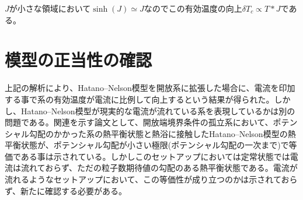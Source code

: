 \documentclass[dvipdfmx,autodetect-engine]{jsarticle}
\begin{document}
$J$が小さな領域において$\sinh(J)\simeq J$なのでこの有効温度の向上$\delta T_c\propto T*J$である。

\section{模型の正当性の確認}
上記の解析により、Hatano--Nelson模型を開放系に拡張した場合に、電流を印加する事で系の有効温度が電流に比例して向上するという結果が得られた。しかし、Hatano--Nelson模型が現実的な電流が流れている系を表現しているかは別の問題である。関連を示す論文として、開放端境界条件の孤立系において、ポテンシャル勾配のかかった系の熱平衡状態と熱浴に接触したHatano--Nelson模型の熱平衡状態が、ポテンシャル勾配が小さい極限(ポテンシャル勾配の一次まで)で等価である事は示されている\cite{SEatT}。しかしこのセットアップにおいては定常状態では電流は流れておらず、ただの粒子数期待値の勾配のある熱平衡状態である。電流が流れるようなセットアップにおいて、この等価性が成り立つのかは示されておらず、新たに確認する必要がある。
\end{document}
